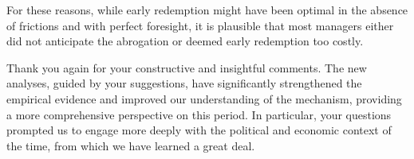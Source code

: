 For these reasons, while early redemption might have been optimal in the absence of frictions and with perfect foresight, it is plausible that most managers either did not anticipate the abrogation or deemed early redemption too costly.

Thank you again for your constructive and insightful comments. The new analyses, guided by your suggestions, have significantly strengthened the empirical evidence and improved our understanding of the mechanism, providing a more comprehensive perspective on this period. In particular, your questions prompted us to engage more deeply with the political and economic context of the time, from which we have learned a great deal.
